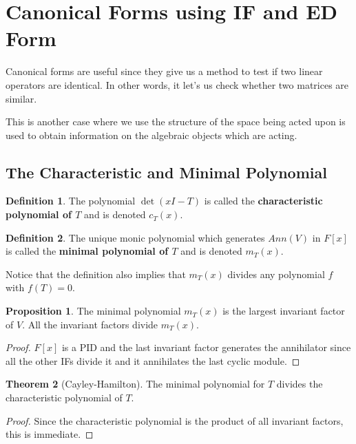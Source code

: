 \documentclass{article}
\theoremstyle{definition}
\newtheorem{definition}{Definition}
\newtheorem{theorem}{Theorem}[section]
\newtheorem{proposition}[theorem]{Proposition}
\begin{document}
\section{Canonical Forms using IF and ED Form}

Canonical forms are useful since they give us a method to test if
two linear operators are identical. In other words, it let's us check
whether two matrices are similar.

This is another case where we use the structure of the space being acted upon is used to obtain
information on the algebraic objects which are acting.

\subsection{The Characteristic and Minimal Polynomial}

\begin{definition}
    The polynomial $\det(xI - T)$ is called the \textbf{characteristic polynomial of $T$} and
    is denoted $c_{T}(x)$.
\end{definition}

\begin{definition}
    The unique monic polynomial which generates $Ann(V)$ in $F[x]$ is called the \textbf{minimal polynomial of $T$}
    and is denoted $m_{T}(x)$. 
\end{definition}

Notice that the definition also implies that $m_{T}(x)$ divides any polynomial $f$ with $f(T) = 0$.

\begin{proposition}
    The minimal polynomial $m_{T}(x)$ is the largest invariant factor of $V$. All the invariant factors
    divide $m_{T}(x)$.
\end{proposition}
\begin{proof}
    $F[x]$ is a PID and the last invariant factor generates the annihilator since all the other IFs
    divide it and it annihilates the last cyclic module.
\end{proof}

\begin{theorem}[Cayley-Hamilton]
    The minimal polynomial for $T$ divides the characteristic polynomial of $T$.
\end{theorem}
\begin{proof}
    Since the characteristic polynomial is the product of all invariant factors, this is immediate.
\end{proof}
\end{document}
